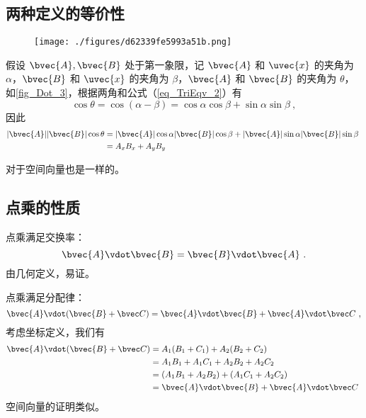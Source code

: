 \subsection{两种定义的等价性}
\begin{figure}[ht]
\centering
\texttt{[image: ./figures/d62339fe5993a51b.png]}
\caption{} \label{fig_Dot_3}
\end{figure}
假设 $\bvec{A}, \bvec{B}$ 处于第一象限，记 $\bvec{A}$ 和 $\uvec{x}$ 的夹角为 $\alpha$，$\bvec{B}$ 和 $\uvec{x}$ 的夹角为 $\beta$，$\bvec{A}$ 和 $\bvec{B}$ 的夹角为 $\theta$，如\autoref{fig_Dot_3}，根据两角和公式（\autoref{eq_TriEqv_2}）有
\begin{equation}
\cos\theta = \cos(\alpha-\beta) = \cos\alpha \cos\beta + \sin\alpha \sin\beta~,
\end{equation}
因此
\begin{equation}
\begin{aligned}
|\bvec{A}| |\bvec{B}| \cos\theta &= |\bvec{A}| \cos\alpha |\bvec{B}| \cos\beta + |\bvec{A}| \sin\alpha |\bvec{B}| \sin\beta \\
&= A_x B_x + A_y B_y
\end{aligned}~
\end{equation}


对于空间向量也是一样的。

\subsection{点乘的性质}

点乘满足交换率：
\begin{equation}\label{eq_Dot_2}
\bvec{A} \vdot \bvec{B} = \bvec{B} \vdot \bvec{A}~.
\end{equation}
由几何定义，易证。

点乘满足分配律：
\begin{equation}\label{eq_Dot_3}
\bvec{A} \vdot (\bvec{B} + \bvec C) = \bvec{A} \vdot \bvec{B} + \bvec{A} \vdot \bvec C~,
\end{equation}
考虑坐标定义，我们有
\begin{equation}
\begin{aligned}
\bvec{A} \vdot (\bvec{B} + \bvec C) &= A_1 (B_1 + C_1) + A_2 (B_2 + C_2) \\
&= A_1 B_1 + A_1 C_1 + A_2 B_2 + A_2 C_2 \\
&= (A_1 B_1 + A_2 B_2) + (A_1 C_1 + A_2 C_2) \\
&= \bvec{A} \vdot \bvec{B} + \bvec{A} \vdot \bvec C
\end{aligned}~
\end{equation}
空间向量的证明类似。

